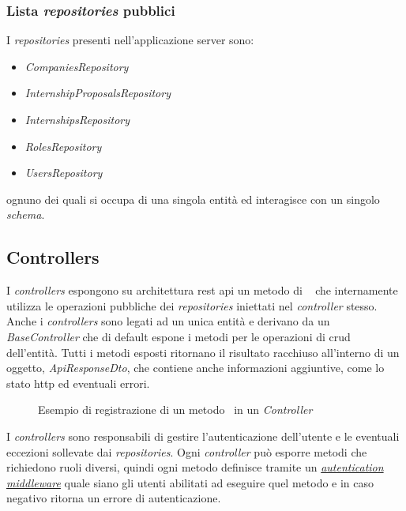\subsubsection{Lista \textit{repositories} pubblici}
I \textit{repositories} presenti nell'applicazione server sono:
\begin{itemize}[itemsep=0pt]
	\item \textit{CompaniesRepository}
	\item \textit{InternshipProposalsRepository}
	\item \textit{InternshipsRepository}
	\item \textit{RolesRepository}
	\item \textit{UsersRepository}
\end{itemize}
ognuno dei quali si occupa di una singola entità ed interagisce con un singolo \textit{schema}. 
\pagebreak
\subsection{Controllers}
\label{server:controllers}
I \textit{controllers} espongono su architettura \acrshort{rest} \acrshort{api} un metodo di \expressjs~ che internamente utilizza le operazioni pubbliche dei \textit{repositories} iniettati nel \textit{controller} stesso. Anche i \textit{controllers} sono legati ad un unica entità e derivano da un \textit{BaseController} che di default espone i metodi per le operazioni di \acrshort{crud} dell'entità. 
Tutti i metodi esposti ritornano il risultato racchiuso all'interno di un oggetto, \textit{ApiResponseDto}, che contiene anche informazioni aggiuntive, come lo stato \acrshort{http} ed eventuali errori.

\begin{figure}[H] 
	\centering    
	
	\caption[Esempio di registrazione di un metodo \expressjs~in un \textit{Controller}]{Esempio di registrazione di un metodo \expressjs~in un \textit{Controller}}
	\label{fig:server-controller-1}
\end{figure}
\noindent
I \textit{controllers} sono responsabili di gestire l'autenticazione dell'utente e le eventuali eccezioni sollevate dai \textit{repositories}. Ogni \textit{controller} può esporre metodi che richiedono ruoli diversi, quindi ogni metodo definisce tramite un \textit{\hyperref[chap:auth-backend]{autentication middleware}} quale siano gli utenti abilitati ad eseguire quel metodo e in caso negativo ritorna un errore di autenticazione.

